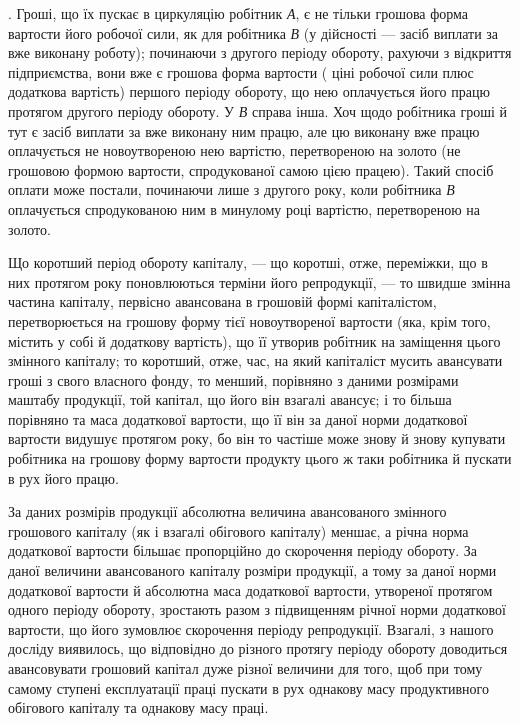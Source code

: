. Гроші, що їх пускає в циркуляцію робітник \emph{А}, є не
тільки грошова форма вартости його робочої сили, як для робітника \emph{В}
(у дійсності — засіб виплати за вже виконану роботу); починаючи з другого
періоду обороту, рахуючи з відкриття підприємства, вони вже є
грошова форма  вартости (\deq{} ціні робочої
сили плюс додаткова вартість) першого періоду обороту, що нею
оплачується його працю протягом другого періоду обороту. У \emph{В} справа
інша. Хоч щодо робітника гроші й тут є засіб виплати за вже виконану
ним працю, але цю виконану вже працю оплачується не новоутвореною
нею вартістю, перетвореною на золото (не грошовою формою вартости,
спродукованої самою цією працею). Такий спосіб оплати може постали,
починаючи лише з другого року, коли робітника \emph{В} оплачується спродукованою
ним в минулому році вартістю, перетвореною на золото.

Що коротший період обороту капіталу, — що коротші, отже, переміжки,
що в них протягом року поновлюються терміни його репродукції, —
то швидше змінна частина капіталу, первісно авансована в грошовій формі
капіталістом, перетворюється на грошову форму тієї новоутвореної
вартости (яка, крім того, містить у собі й додаткову вартість), що її
утворив робітник на заміщення цього змінного капіталу; то коротший,
отже, час, на який капіталіст мусить авансувати гроші з свого власного
фонду, то менший, порівняно з даними розмірами маштабу продукції, той
капітал, що його він взагалі авансує; і то більша порівняно та маса додаткової
вартости, що її він за даної норми додаткової вартости видушує
протягом року, бо він то частіше може знову й знову купувати
робітника на грошову форму вартости продукту цього ж таки робітника
й пускати в рух його працю.

За даних розмірів продукції абсолютна величина авансованого змінного
грошового капіталу (як і взагалі обігового капіталу) меншає, а річна
норма додаткової вартости більшає пропорційно до скорочення періоду
обороту. За даної величини авансованого капіталу розміри продукції,
а тому за даної норми додаткової вартости й абсолютна маса додаткової
вартости, утвореної протягом одного періоду обороту, зростають разом
з підвищенням річної норми додаткової вартости, що його зумовлює
скорочення періоду репродукції. Взагалі, з нашого досліду виявилось, що
відповідно до різного протягу періоду обороту доводиться авансовувати грошовий
капітал дуже різної величини для того, щоб при тому самому
ступені експлуатації праці пускати в рух однакову масу продуктивного
обігового капіталу та однакову масу праці.

